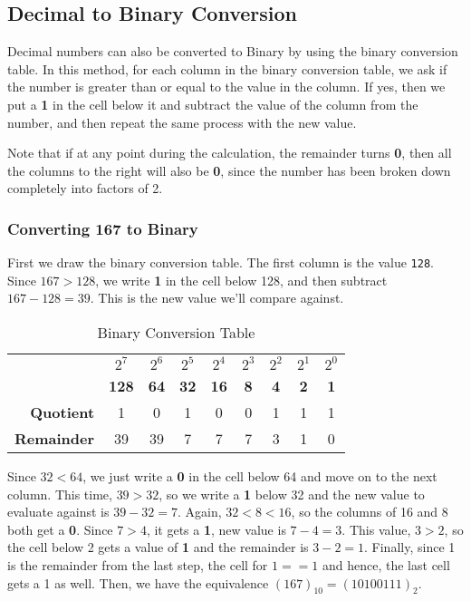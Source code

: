 \subsection{Decimal to Binary Conversion}
Decimal numbers can also be converted to Binary by using the binary conversion table. In this method, for each column in the binary conversion table, we ask if the number is greater than or equal to the value in the column. If yes, then we put a \textbf{1} in the cell below it and subtract the value of the column from the number, and then repeat the same process with the new value. 

Note that if at any point during the calculation, the remainder turns \textbf{0}, then all the columns to the right will also be \textbf{0}, since the number has been broken down completely into factors of 2. 

\subsubsection{Converting 167 to Binary}
First we draw the binary conversion table. The first column is the value \verb|128|. Since $167>128$, we write \textbf{1} in the cell below 128, and then subtract $167-128=39$. This is the new value we'll compare against. 

\begin{table}[H]
	\centering
	\begin{tabular}{rcccccccc}
		\toprule
		&$2^7$ &$2^6$ &$2^5$ &$2^4$ &$2^3$ &$2^2$ &$2^1$ &$2^0$ \\
		&\textbf{128} &\textbf{64} &\textbf{32} &\textbf{16} &\textbf{8} &\textbf{4} &\textbf{2} &\textbf{1} \\
		\midrule
		\textbf{Quotient} &1 &0 &1 &0 &0 &1 &1 &1 \\
		\midrule
		\textbf{Remainder} &39 &39 &7 &7 &7 &3 &1 &0 \\
		\bottomrule
	\end{tabular}
	\vspace{-5pt}
	\caption{Binary Conversion Table}
\end{table}
\vspace{-10pt}

\noindent
Since $32<64$, we just write a \textbf{0} in the cell below 64 and move on to the next column. This time, $39>32$, so we write a \textbf{1} below 32 and the new value to evaluate against is $39-32=7$. Again, $32<8<16$, so the columns of 16 and 8 both get a \textbf{0}. Since $7>4$, it gets a \textbf{1}, new value is $7-4=3$. This value, $3>2$, so the cell below 2 gets a value of \textbf{1} and the remainder is $3-2=1$. Finally, since 1 is the remainder from the last step, the cell for $1 == 1$ and hence, the last cell gets a 1 as well. Then, we have the equivalence $(167)_{10} = (10100111)_2$.


